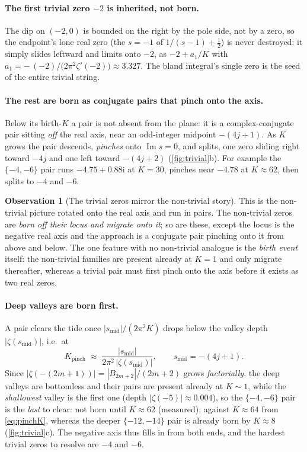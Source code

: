 \documentclass[11pt]{article}
\theoremstyle{definition}
\newtheorem{observation}{Observation}
\renewcommand{\Im}{\operatorname{Im}}
\newcommand{\iu}{\mathrm{i}}
\begin{document}
\paragraph{The first trivial zero $-2$ is inherited, not born.}
The dip on $(-2,0)$ is bounded on the right by the pole side, not by a zero, so the
endpoint's lone real zero (the $s=-1$ of $1/(s-1)+\tfrac12$) is never destroyed: it
simply slides leftward and limits onto $-2$, as $-2+a_1/K$ with
$a_1=-\,(-2)/\bigl(2\pi^2\zeta'(-2)\bigr)\approx3.327$. The bland integral's single
zero is the seed of the entire trivial string.

\paragraph{The rest are born as conjugate pairs that pinch onto the axis.}
Below its birth-$K$ a pair is not absent from the plane: it is a complex-conjugate
pair sitting \emph{off} the real axis, near an odd-integer midpoint $-(4j+1)$. As $K$
grows the pair descends, \emph{pinches} onto $\Im s=0$, and splits, one zero sliding
right toward $-4j$ and one left toward $-(4j+2)$ (\cref{fig:trivial}b). For example
the $\{-4,-6\}$ pair runs $-4.75+0.88\iu$ at $K=30$, pinches near $-4.78$ at
$K\approx62$, then splits to $-4$ and $-6$.

\begin{observation}[The trivial zeros mirror the non-trivial story]\label{obs:mirror}
This is the non-trivial picture rotated onto the real axis and run in pairs. The
non-trivial zeros are \emph{born off their locus and migrate onto it}; so are these,
except the locus is the negative real axis and the approach is a conjugate pair
pinching onto it from above and below. The one feature with no non-trivial analogue
is the \emph{birth event} itself: the non-trivial families are present already at
$K=1$ and only migrate thereafter, whereas a trivial pair must first pinch onto the
axis before it exists as two real zeros.
\end{observation}

\paragraph{Deep valleys are born first.}
A pair clears the tide once $|s_{\mathrm{mid}}|/(2\pi^2K)$ drops below the valley
depth $|\zeta(s_{\mathrm{mid}})|$, i.e.\ at
\begin{equation}\label{eq:pinchK}
  K_{\mathrm{pinch}}\;\approx\;\frac{|s_{\mathrm{mid}}|}{2\pi^2\,|\zeta(s_{\mathrm{mid}})|},
  \qquad s_{\mathrm{mid}}=-(4j+1).
\end{equation}
Since $|\zeta(-(2m+1))|=|B_{2m+2}|/(2m+2)$ grows \emph{factorially}, the deep valleys
are bottomless and their pairs are present already at $K\sim1$, while the
\emph{shallowest} valley is the first one (depth $|\zeta(-5)|\approx0.004$), so the
$\{-4,-6\}$ pair is the \emph{last} to clear: not born until $K\approx62$ (measured),
against $K\approx64$ from \eqref{eq:pinchK}, whereas the deeper $\{-12,-14\}$ pair is
already born by $K\approx8$ (\cref{fig:trivial}c). The negative axis thus fills in
from both ends, and the hardest trivial zeros to resolve are $-4$ and $-6$.
\end{document}
